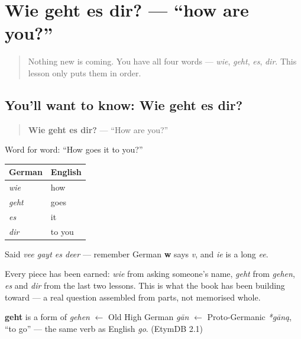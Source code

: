 \section[Wie geht es dir?]{Wie geht es dir? — \textquotedblleft{}how are you?\textquotedblright{}}

\label{lesson:GE-C03-wie-geht-es}



\begin{quote}
Nothing new is coming. You have all four words — \emph{wie}, \emph{geht}, \emph{es}, \emph{dir}. This lesson only puts them in order.
\end{quote}

\subsection*{You'll want to know: Wie geht es dir?}
\begin{quote}
\textbf{Wie geht es dir?} — \textquotedblleft{}How are you?\textquotedblright{}
\end{quote}

Word for word: \textquotedblleft{}How goes it to you?\textquotedblright{}

\noindent
\begin{tabularx}{\linewidth}{@{}>{\raggedright\arraybackslash}X>{\raggedright\arraybackslash}X@{}}
\toprule
\textbf{German} & \textbf{English} \\
\midrule
\emph{wie} & how \\
\emph{geht} & goes \\
\emph{es} & it \\
\emph{dir} & to you \\
\bottomrule
\end{tabularx}

Said \emph{vee gayt es deer} — remember German \textbf{w} says \emph{v}, and \emph{ie} is a long \emph{ee}.

Every piece has been earned: \emph{wie} from asking someone's name, \emph{geht} from \emph{gehen}, \emph{es} and \emph{dir} from the last two lessons. This is what the book has been building toward — a real question assembled from parts, not memorised whole.

\begin{cousinweb}
\textbf{geht} is a form of \emph{gehen} $\leftarrow$ Old High German \emph{gān} $\leftarrow$ Proto-Germanic \emph{*gāną}, \textquotedblleft{}to go\textquotedblright{} — the same verb as English \emph{go}. (EtymDB 2.1)
\end{cousinweb}

